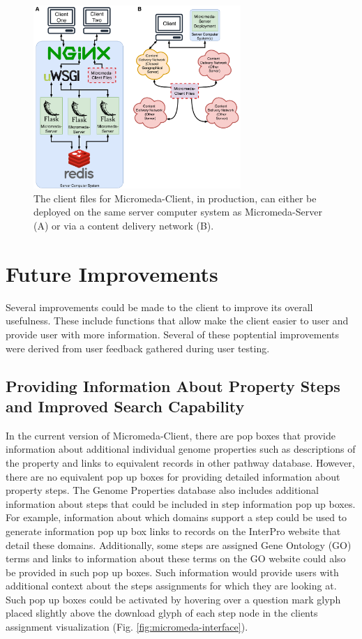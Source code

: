 \begin{figure}[!ht]
  \centering
	\includegraphics[width=0.7\textwidth]{media/micromeda-client-deployment.pdf}
	 \caption{The client files for Micromeda-Client, in production, can either be deployed on the same server computer system as Micromeda-Server (A) or via a content delivery network (B).}
	 \label{fig:client-deployment}
\end{figure}

\section{Future Improvements} \label{client-improvements}

Several improvements could be made to the client to improve its overall usefulness. These include functions that allow make the client easier to user and provide user with more information. Several of these poptential improvements were derived from user feedback gathered during user testing.

\subsection{Providing Information About Property Steps and Improved Search Capability}

In the current version of Micromeda-Client, there are pop boxes that provide information about additional individual genome properties such as descriptions of the property and links to equivalent records in other pathway database. However, there are no equivalent pop up boxes for providing detailed information about property steps. The Genome Properties database also includes additional information about steps that could be included in step information pop up boxes. For example, information about which domains support a step could be used to generate information pop up box links to records on the InterPro website that detail these domains. Additionally, some steps are assigned Gene Ontology (GO) terms and links to information about these terms on the GO website could also be provided in such pop up boxes. Such information would provide users with additional context about the steps assignments for which they are looking at. Such pop up boxes could be activated by hovering over a question mark glyph placed slightly above the download glyph of each step node in the clients assignment visualization (Fig. \ref{fig:micromeda-interface}).

